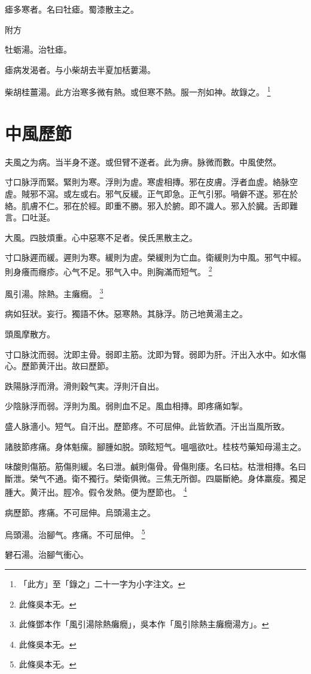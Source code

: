 \documentclass[12pt,twoside,UTF8,b5paper]{ctexbook}
\begin{document}
瘧多寒者。名曰牡瘧。蜀漆散主之。

附方

牡蛎湯。治牡瘧。

瘧病发渴者。与小柴胡去半夏加栝蔞湯。

柴胡桂薑湯。此方治寒多微有熱。或但寒不熱。服一剂如神。故錄之。
	\footnote{「此方」至「錄之」二十一字为小字注文。}

\chapter{中風歷節}

夫風之为病。当半身不遂。或但臂不遂者。此为痹。脉微而數。中風使然。

寸口脉浮而緊。緊則为寒。浮則为虗。寒虗相摶。邪在皮膚。浮者血虗。絡脉空虗。賊邪不瀉。或左或右。邪气反緩。正气即急。正气引邪。喎僻不遂。邪在於絡。肌膚不仁。邪在於經。即重不勝。邪入於腑。即不識人。邪入於臓。舌即難言。口吐涎。

大風。四肢煩重。心中惡寒不足者。侯氏黑散主之。

寸口脉遲而緩。遲則为寒。緩則为虗。榮緩則为亡血。衛緩則为中風。邪气中經。則身癢而癮疹。心气不足。邪气入中。則胸滿而短气。
	\footnote{此條吳本无。}

風引湯。除熱。主癱癇。
	\footnote{此條鄧本作「風引湯除熱癱癇」，吳本作「風引除熱主癱癇湯方」。}

病如狂狀。妄行。獨語不休。惡寒熱。其脉浮。防己地黄湯主之。

頭風摩散方。

寸口脉沈而弱。沈即主骨。弱即主筋。沈即为腎。弱即为肝。汗出入水中。如水傷心。歷節黄汗出。故曰歷節。

跌陽脉浮而滑。滑則穀气実。浮則汗自出。

少陰脉浮而弱。浮則为風。弱則血不足。風血相摶。即疼痛如掣。

盛人脉濇小。短气。自汗出。歷節疼。不可屈伸。此皆飲酒。汗出当風所致。

諸肢節疼痛。身体魁瘰。腳腫如脱。頭眩短气。嗢嗢欲吐。桂枝芍藥知母湯主之。

味酸則傷筋。筋傷則緩。名曰泄。鹹則傷骨。骨傷則痿。名曰枯。枯泄相摶。名曰斷泄。榮气不通。衛不獨行。榮衛俱微。三焦无所御。四屬斷絶。身体羸瘦。獨足腫大。黄汗出。脛冷。假令发熱。便为歷節也。
	\footnote{此條吳本无。}

病歷節。疼痛。不可屈伸。烏頭湯主之。

烏頭湯。治腳气。疼痛。不可屈伸。
	\footnote{此條吳本无。}

礬石湯。治腳气衝心。
\end{document}
